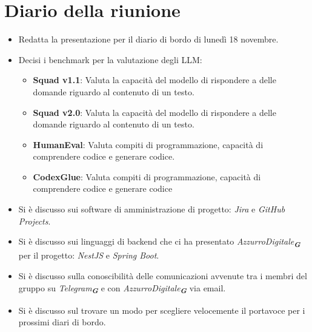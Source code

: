 
\section{Diario della riunione}

\begin{itemize}
    \item Redatta la presentazione per il diario di bordo di lunedì 18 novembre.
    \item Decisi i benchmark per la valutazione degli LLM:
    \begin{itemize}
        \item \textbf{Squad v1.1}: Valuta la capacità del modello di rispondere a delle domande riguardo al contenuto di un testo.
        \item \textbf{Squad v2.0}: Valuta la capacità del modello di rispondere a delle domande riguardo al contenuto di un testo.
        \item \textbf{HumanEval}: Valuta compiti di programmazione, capacità di comprendere codice e generare codice.
        \item \textbf{CodexGlue}: Valuta compiti di programmazione, capacità di comprendere codice e generare codice
    \end{itemize}
    \item Si è discusso sui software di amministrazione di progetto: \emph{Jira} e \emph{GitHub Projects}.
    \item Si è discusso sui linguaggi di backend che ci ha presentato \emph{AzzurroDigitale}\textsubscript{\textit{\textbf{G}}} per il progetto:
    \emph{NestJS} e \emph{Spring Boot}.
    \item Si è discusso sulla conoscibilità delle comunicazioni avvenute tra i membri del gruppo su \emph{Telegram}\textsubscript{\textit{\textbf{G}}} e con 
    \emph{AzzurroDigitale}\textsubscript{\textit{\textbf{G}}} via email.
    \item Si è discusso sul trovare un modo per scegliere velocemente il portavoce per i prossimi diari di bordo.
\end{itemize}